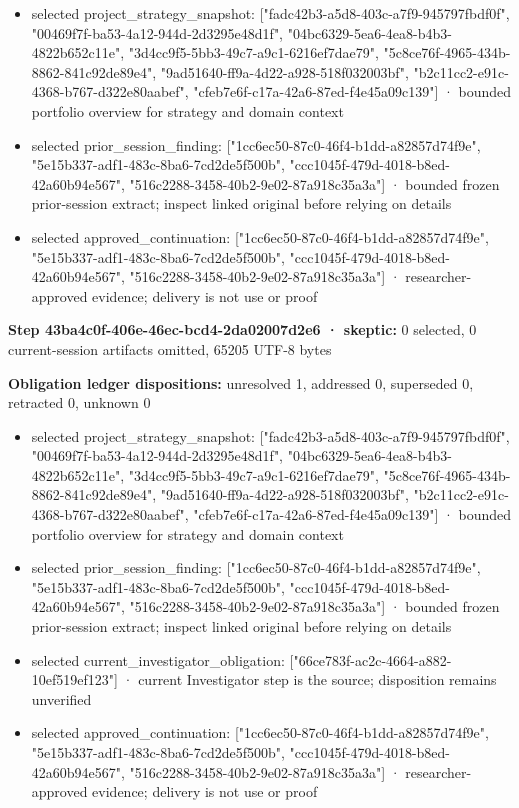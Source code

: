 \documentclass[11pt]{article}
\begin{document}
\begin{itemize}
\item selected project\_strategy\_snapshot: ["fadc42b3-a5d8-403c-a7f9-945797fbdf0f", "00469f7f-ba53-4a12-944d-2d3295e48d1f", "04bc6329-5ea6-4ea8-b4b3-4822b652c11e", "3d4cc9f5-5bb3-49c7-a9c1-6216ef7dae79", "5c8ce76f-4965-434b-8862-841c92de89e4", "9ad51640-ff9a-4d22-a928-518f032003bf", "b2c11cc2-e91c-4368-b767-d322e80aabef", "cfeb7e6f-c17a-42a6-87ed-f4e45a09c139"] · bounded portfolio overview for strategy and domain context
\item selected prior\_session\_finding: ["1cc6ec50-87c0-46f4-b1dd-a82857d74f9e", "5e15b337-adf1-483c-8ba6-7cd2de5f500b", "ccc1045f-479d-4018-b8ed-42a60b94e567", "516c2288-3458-40b2-9e02-87a918c35a3a"] · bounded frozen prior-session extract; inspect linked original before relying on details
\item selected approved\_continuation: ["1cc6ec50-87c0-46f4-b1dd-a82857d74f9e", "5e15b337-adf1-483c-8ba6-7cd2de5f500b", "ccc1045f-479d-4018-b8ed-42a60b94e567", "516c2288-3458-40b2-9e02-87a918c35a3a"] · researcher-approved evidence; delivery is not use or proof
\end{itemize}
\textbf{Step 43ba4c0f-406e-46ec-bcd4-2da02007d2e6 · skeptic:} 0 selected, 0 current-session artifacts omitted, 65205 UTF-8 bytes\par
\textbf{Obligation ledger dispositions:} unresolved 1, addressed 0, superseded 0, retracted 0, unknown 0\par
\begin{itemize}
\item selected project\_strategy\_snapshot: ["fadc42b3-a5d8-403c-a7f9-945797fbdf0f", "00469f7f-ba53-4a12-944d-2d3295e48d1f", "04bc6329-5ea6-4ea8-b4b3-4822b652c11e", "3d4cc9f5-5bb3-49c7-a9c1-6216ef7dae79", "5c8ce76f-4965-434b-8862-841c92de89e4", "9ad51640-ff9a-4d22-a928-518f032003bf", "b2c11cc2-e91c-4368-b767-d322e80aabef", "cfeb7e6f-c17a-42a6-87ed-f4e45a09c139"] · bounded portfolio overview for strategy and domain context
\item selected prior\_session\_finding: ["1cc6ec50-87c0-46f4-b1dd-a82857d74f9e", "5e15b337-adf1-483c-8ba6-7cd2de5f500b", "ccc1045f-479d-4018-b8ed-42a60b94e567", "516c2288-3458-40b2-9e02-87a918c35a3a"] · bounded frozen prior-session extract; inspect linked original before relying on details
\item selected current\_investigator\_obligation: ["66ce783f-ac2c-4664-a882-10ef519ef123"] · current Investigator step is the source; disposition remains unverified
\item selected approved\_continuation: ["1cc6ec50-87c0-46f4-b1dd-a82857d74f9e", "5e15b337-adf1-483c-8ba6-7cd2de5f500b", "ccc1045f-479d-4018-b8ed-42a60b94e567", "516c2288-3458-40b2-9e02-87a918c35a3a"] · researcher-approved evidence; delivery is not use or proof
\end{itemize}
\end{document}
